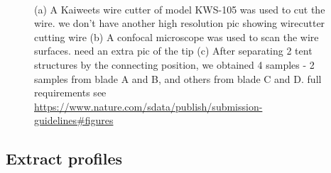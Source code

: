 \documentclass[fleqn,10pt]{wlscirep}
\newcommand{\tom}[1]{{\textcolor{RedOrange}{#1}}}
\begin{document}
\begin{figure}
\begin{minipage}{0.30\linewidth}
\subcaption{\label{fig-wire-microscope}}

\end{minipage}%
%
\begin{minipage}{0.05\linewidth}
~\end{minipage}%
%
\begin{minipage}{0.65\linewidth}


\subcaption{\label{fig-T1AW-LI-R2-4edges}}

\end{minipage}%

\caption{\label{fig-cut-tent-scan}(a) A Kaiweets wire cutter of model
KWS-105 was used to cut the wire.
\tom{we don't have another high resolution pic showing wirecutter cutting wire}
(b) A confocal microscope was used to scan the wire surfaces.
\tom{need an extra pic of the tip} (c) After separating 2 tent
structures by the connecting position, we obtained 4 samples - 2 samples
from blade A and B, and others from blade C and D.
\tom{full requirements see \href{https://www.nature.com/sdata/publish/submission-guidelines\#figures}{https://www.nature.com/sdata/publish/submission-guidelines\#figures}}}

\end{figure}%

\subsection*{Extract profiles}\label{sec-extract-profiles}
\end{document}
